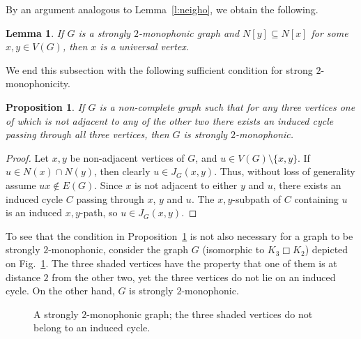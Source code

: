\documentclass[a4paper,11pt]{article}
\newtheorem{lemma}[theorem]{Lemma}
\newtheorem{proposition}[theorem]{Proposition}
\begin{document}
By an argument analogous to Lemma~\ref{l:neigho}, we obtain the following.

\begin{lemma}\label{l:neigh}
    If $G$ is a strongly $2$-monophonic graph and $N[y]\subseteq N[x]$ for some $x,y\in V(G)$, then $x$ is a universal vertex.
\end{lemma}

\fi

We end this subsection with the following sufficient condition for strong $2$-monophonicity.

\begin{proposition}
\label{prp:sufficient}
If $G$ is a non-complete graph such that for any three vertices one of which is not adjacent to any of the other two there exists an induced cycle passing through all three vertices, then $G$ is strongly $2$-monophonic. 
\end{proposition}
\begin{proof}
    Let $x,y$ be non-adjacent vertices of $G$, and $u\in V(G)\setminus\{x,y\}$. If $u\in N(x)\cap N(y)$, then clearly $u\in J_G(x,y)$. Thus, without loss of generality assume $ux\notin E(G)$. Since $x$ is not adjacent to either $y$ and $u$, there exists an induced cycle $C$ passing through $x$, $y$ and $u$. The $x,y$-subpath of $C$ containing $u$ is an induced $x,y$-path, so $u\in J_G(x,y)$.
\end{proof}

To see that the condition in Proposition~\ref{prp:sufficient} is not also necessary for a graph to be strongly $2$-monophonic, consider the graph $G$ (isomorphic to $K_3\Box K_2$) depicted on Fig.~\ref{fig:hamming}. The three shaded vertices have the property that one of them is at distance $2$ from the other two, yet the three vertices do not lie on an induced cycle. On the other hand, $G$ is strongly $2$-monophonic. 

\begin{figure}[htb]
\begin{center}
\caption{A strongly $2$-monophonic graph; the three shaded vertices do not belong to an induced cycle.}
\label{fig:hamming}
\end{center}
\end{figure}
\end{document}
